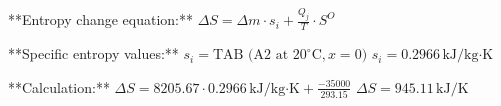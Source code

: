 **Entropy change equation:**  
\( \Delta S = \Delta m \cdot s_i + \frac{Q_{j}}{T} \cdot S^O \)  

**Specific entropy values:**  
\( s_i = \text{TAB (A2 at } 20^\circ \text{C}, x = 0) \)  
\( s_i = 0.2966 \, \text{kJ/kg·K} \)  

**Calculation:**  
\( \Delta S = 8205.67 \cdot 0.2966 \, \text{kJ/kg·K} + \frac{-35000}{293.15} \)  
\( \Delta S = 945.11 \, \text{kJ/K} \)